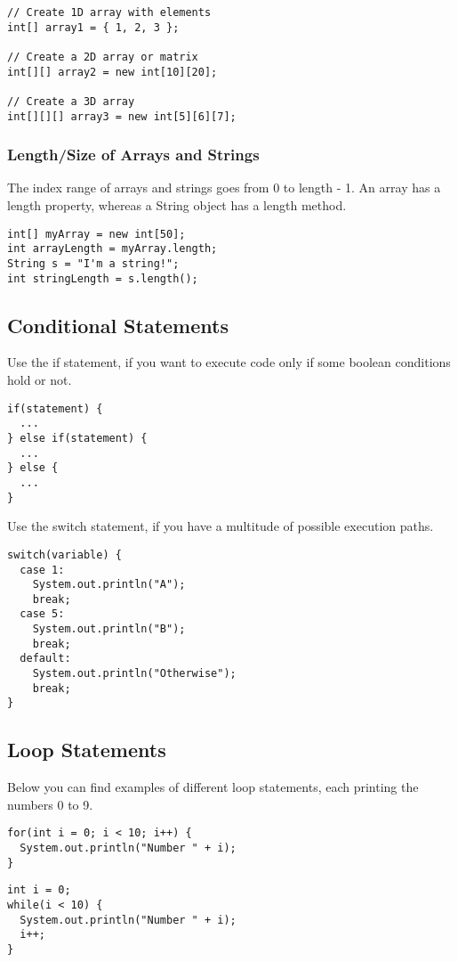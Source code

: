 \documentclass[papersize=a4,paper=landscape,11pt]{scrartcl}
\begin{document}
\begin{multicols*}{3}
\begin{lstlisting}
// Create 1D array with elements
int[] array1 = { 1, 2, 3 };

// Create a 2D array or matrix
int[][] array2 = new int[10][20];

// Create a 3D array
int[][][] array3 = new int[5][6][7];
\end{lstlisting}

\subsubsection*{Length/Size of Arrays and Strings}
The index range of arrays and strings goes from 0 to length - 1.
An array has a length property, whereas a String object has a length method.

\begin{lstlisting}
int[] myArray = new int[50];
int arrayLength = myArray.length;
String s = "I'm a string!";
int stringLength = s.length();
\end{lstlisting}

\subsection*{Conditional Statements}
Use the if statement, if you want to execute code only if some boolean conditions hold or not.
\begin{lstlisting}
if(statement) {
  ...
} else if(statement) {
  ...
} else {
  ...
}
\end{lstlisting}
Use the switch statement, if you have a multitude of possible execution paths.
\begin{lstlisting}
switch(variable) {
  case 1:
    System.out.println("A");
    break;
  case 5:
    System.out.println("B");
    break;
  default:
    System.out.println("Otherwise");
    break;
}
\end{lstlisting}

\subsection*{Loop Statements}
Below you can find examples of different loop statements, each printing the numbers 0 to 9.
\begin{lstlisting}
for(int i = 0; i < 10; i++) {
  System.out.println("Number " + i);
}
\end{lstlisting}


\begin{lstlisting}
int i = 0;
while(i < 10) {
  System.out.println("Number " + i);
  i++;
}
\end{lstlisting}


\end{multicols*}
\end{document}
